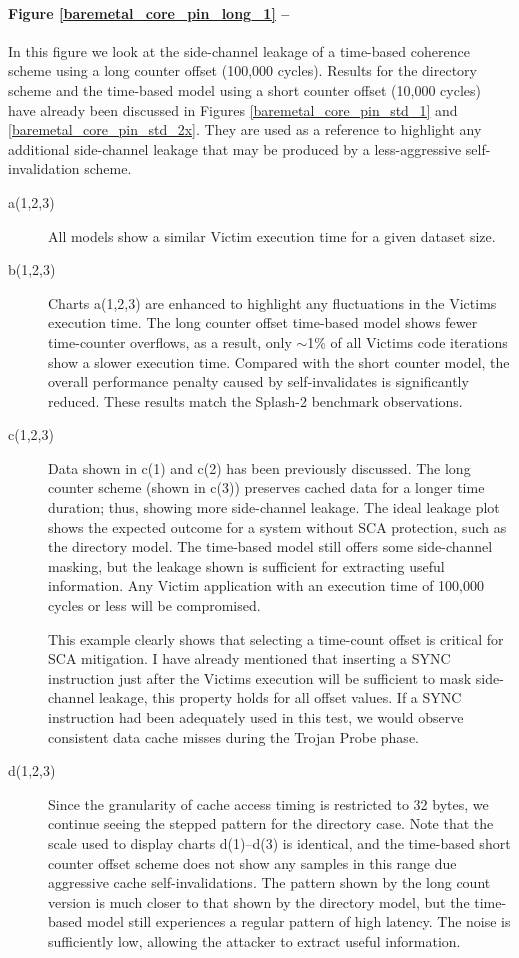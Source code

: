 				\paragraph{Figure \ref{baremetal_core_pin_long_1} --}
						In this figure we look at the side-channel leakage of a time-based coherence scheme using a long counter offset (100,000 cycles). Results for the directory scheme and the time-based model using a short counter offset (10,000 cycles) have already been discussed in Figures \ref{baremetal_core_pin_std_1} and \ref{baremetal_core_pin_std_2x}. They are used as a reference to highlight any additional side-channel leakage that may be produced by a less-aggressive self-invalidation scheme.
					\begin{description}
					\item [a(1,2,3)] 
						All models show a similar Victim execution time for a given dataset size.
					\item [b(1,2,3)]
						Charts a(1,2,3) are enhanced to highlight any fluctuations in the Victims execution time. The long counter offset time-based model  shows fewer time-counter overflows, as a result, only $\sim$1\% of all Victims code iterations show a slower execution time. Compared with the short counter model, the overall performance penalty caused by self-invalidates is significantly reduced. These results match the Splash-2 benchmark observations.
					\item [c(1,2,3)]
						Data shown in c(1) and c(2) has been previously discussed. The long counter scheme (shown in c(3)) preserves cached data for a longer time duration; thus, showing more side-channel leakage. The ideal leakage plot shows the expected outcome for a system without SCA protection, such as the directory model. The time-based model still offers some side-channel masking, but the leakage shown is sufficient for extracting useful information. Any Victim application with an execution time of 100,000 cycles or less will be compromised. 
						
						This example clearly shows that selecting a time-count offset is critical for SCA mitigation. I have already mentioned that inserting a SYNC instruction just after the Victims execution will be sufficient to mask side-channel leakage, this property holds for all offset values. If a SYNC instruction had been adequately used in this test, we would observe consistent data cache misses during the Trojan Probe phase.
					\item [d(1,2,3)] 
						Since the granularity of cache access timing is restricted to 32 bytes, we continue seeing the stepped pattern for the directory case. Note that the scale used to display charts d(1)--d(3) is identical, and the time-based short counter offset scheme does not show any samples in this range due aggressive cache self-invalidations. The pattern shown by the long count version is much closer to that shown by the directory model, but the time-based model still experiences a regular pattern of high latency. The noise is sufficiently low, allowing the attacker to extract useful information.
					\end{description}
				
